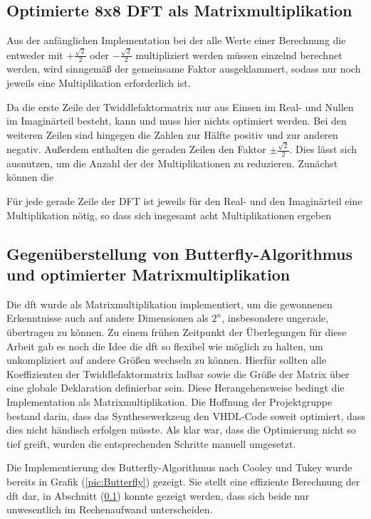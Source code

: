 \subsection{Optimierte 8x8 DFT als Matrixmultiplikation}\label{sec:OptimierteMatrixmultiplikation}

Aus der anfänglichen Implementation bei der alle Werte einer Berechnung die entweder mit $+\frac{\sqrt{2}}{2}$ oder $-\frac{\sqrt{2}}{2}$ multipliziert werden müssen 
einzelnd berechnet werden, wird sinngemäß der gemeinsame Faktor ausgeklammert, sodass nur noch jeweils eine Multiplikation erforderlich ist.

Da die erste Zeile der Twiddlefaktormatrix nur aus Einsen im Real- und Nullen im Imaginärteil besteht, kann und muss hier nichts optimiert werden. 
Bei den weiteren Zeilen sind hingegen die Zahlen zur Hälfte positiv und zur anderen negativ. Außerdem enthalten die geraden Zeilen den Faktor $\pm\frac{\sqrt{2}}{2}$. 
Dies lässt sich ausnutzen, um die Anzahl der der Multiplikationen zu reduzieren. Zunächst können die 

Für jede gerade Zeile der DFT ist jeweils für den Real- und den Imaginärteil eine Multiplikation nötig, so dass sich insgesamt acht Multiplikationen ergeben



\subsection{Gegenüberstellung von Butterfly-Algorithmus und optimierter Matrixmultiplikation} 

Die \gls{dft} wurde als Matrixmultiplikation implementiert, um die gewonnenen Erkenntnisse auch auf andere Dimensionen als $2^n$, insbesondere ungerade, 
übertragen zu können.  
Zu einem frühen Zeitpunkt der Überlegungen für diese Arbeit gab es noch die Idee die \gls{dft} so flexibel wie möglich zu halten, um unkompliziert auf andere Größen wechseln zu können.
Hierfür sollten alle Koeffizienten der Twiddlefaktormatrix ladbar sowie die Größe der Matrix über eine globale Deklaration definierbar sein.
Diese Herangehensweise bedingt die Implementation als Matrixmultiplikation. Die Hoffnung der Projektgruppe bestand darin, dass das Synthesewerkzeug den 
VHDL-Code soweit optimiert, dass dies nicht händisch erfolgen müsste.
Als klar war, dass die Optimierung nicht so tief greift, wurden die entsprechenden Schritte manuell umgesetzt. 
  
Die Implementierung des Butterfly-Algorithmus nach Cooley und Tukey wurde bereits in Grafik (\ref{pic:Butterfly}) gezeigt. Sie stellt eine effiziente Berechnung der \gls{dft} dar, in 
Abschnitt (\ref{sec:OptimierteMatrixmultiplikation}) konnte gezeigt werden, dass sich beide nur unwesentlich im Rechenaufwand unterscheiden.


